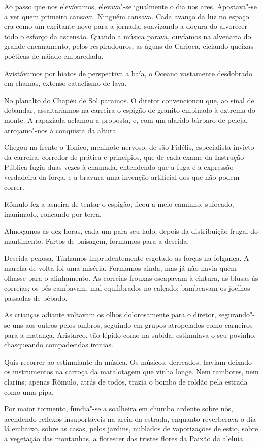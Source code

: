 Ao passo que nos elevávamos, elevava"-se
igualmente o dia nos ares. Apostava"-se a ver quem primeiro cansava.
Ninguém cansava. Cada avanço da luz no espaço era como um excitante
novo para a jornada, suavizando a doçura do alvorecer todo o esforço da
ascensão. Quando a música parava, ouvíamos na alvenaria do grande
encanamento, pelos respiradouros, as águas do Carioca, ciciando queixas
poéticas de náiade emparedada. 

Avistávamos por hiatos de perspectiva a baía, o Oceano 
vastamente desdobrado em chamas, extenso cataclismo de lava. 

No planalto do Chapéu de Sol paramos. O diretor convencionou que,
ao sinal de debandar, assaltaríamos na carreira o espigão de granito
empinado à extrema do monte. A rapaziada aclamou a proposta, e, com um
alarido bárbaro de peleja, arrojamo"-nos à conquista da altura. 

Chegou na frente o Tonico, meninote nervoso, de são Fidélis, especialista
invicto da carreira, corredor de prática e princípios, que de cada
exame da Instrução Pública fugia duas vezes à chamada, entendendo que a
fuga é a expressão verdadeira da força, e a bravura uma invenção
artificial dos que não podem correr. 

Rômulo fez a asneira de tentar o
espigão; ficou a meio caminho, sufocado, inanimado, roncando por terra.

Almoçamos às dez horas, cada um para seu lado, depois da distribuição
frugal do mantimento. Fartos de paisagem, formamos para a descida.

Descida penosa. Tínhamos imprudentemente esgotado as forças na
folgança. A marcha de volta foi uma miséria. Formamos ainda, mas já não
havia quem olhasse para o alinhamento. As correias frouxas escapavam à
cintura, as blusas às correias; os pés cambavam, mal equilibrados no
calçado; bambeavam os joelhos passadas de bêbado. 

As crianças adiante voltavam os olhos dolorosamente para o diretor, 
segurando"-se uns aos
outros pelos ombros, seguindo em grupos atropelados como carneiros para
a matança. Aristarco, tão lépido como na subida, estimulava o seu
povinho, chasqueando compadecidas ironias. 

Quis recorrer ao estimulante
da música. Os músicos, derreados, haviam deixado os instrumentos na
carroça da matalotagem que vinha longe. Nem tambores, nem clarins;
apenas Rômulo, atrás de todos, trazia o bombo de roldão pela estrada
como uma pipa. 

Por maior tormento, fundia"-se a soalheira em chumbo
ardente sobre nós, acendendo reflexos insuportáveis na areia da
estrada, enquanto reverberava o dia lá embaixo, sobre as casas, pelos
jardins, nublados de vaporizações de estio, sobre a vegetação das
montanhas, a florescer das tristes flores da Paixão da aleluia.

